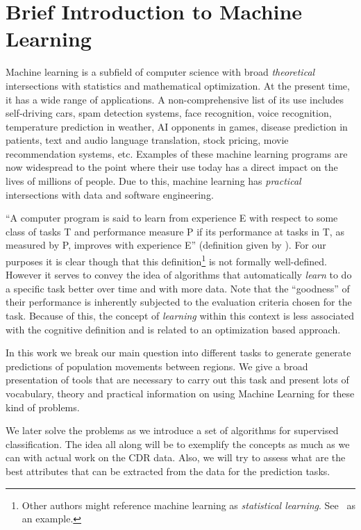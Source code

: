 \section{Brief Introduction to Machine Learning}

Machine learning is a subfield of computer science with broad \textit{theoretical} intersections with statistics and mathematical optimization. At the present time, it has a wide range of applications. A non-comprehensive list of its use includes self-driving cars, spam detection systems, face recognition, voice recognition, temperature prediction in weather, AI opponents in games, disease prediction in patients, text and audio language translation, stock pricing, movie recommendation systems, etc. Examples of these machine learning programs are now widespread to the point where their use today has a direct impact on the lives of millions of people. Due to this, machine learning has \textit{practical} intersections with data and software engineering.

``A computer program is said to learn from experience E with respect to some class of tasks T and performance measure P if its performance at tasks in T, as measured by P, improves with experience E'' (definition given by \cite{Mitchell-MLearning}). For our purposes it is clear though that this definition\footnote{Other authors might reference machine learning as \textit{statistical learning}. See~\cite{hastie-elemstatslearn} as an example.} is not formally well-defined. However it serves to convey the idea of algorithms that automatically \textit{learn} to do a specific task better over time and with more data. Note that the ``goodness'' of their performance is inherently subjected to the evaluation criteria chosen for the task. Because of this, the concept of \textit{learning} within this context is less associated with the cognitive definition and is related to an optimization based approach.

 In this work we break our main question into different tasks to generate generate predictions of population movements between regions.
 We give a broad presentation of tools that are necessary to carry out this task and present lots of vocabulary, theory and practical information on using Machine Learning for these kind of problems.
 
We later solve the problems as we introduce a set of algorithms for supervised classification.
The idea all along will be to exemplify the concepts as much as we can with actual work on the CDR data.
Also, we will try to assess what are the best attributes that can be extracted from the data for the prediction tasks. 
 
